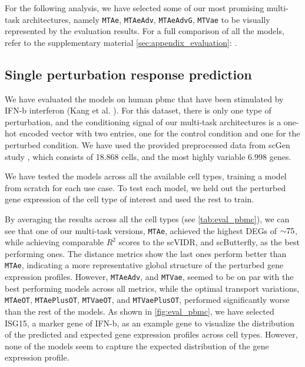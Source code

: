 \documentclass[12pt, a4paper]{article}
\newcommand{\crefwithname}[1]{\cref{#1}: \nameref{#1}}
\begin{document}
For the following analysis, we have selected some of our most promising multi-task architectures, namely \verb|MTAe|, \verb|MTAeAdv|, \verb|MTAeAdvG|, \verb|MTVae| to be visually represented by the evaluation results. For a full comparison of all the models, refer to the supplementary material \crefwithname{sec:appendix_evaluation}. 

\subsection{Single perturbation response prediction}
\label{sec:eval_single_perturbation}

We have evaluated the models on human \gls{pbmc} that have been stimulated by IFN-b interferon (Kang et al. \cite{kanaGenerativeModelingSinglecell2023}). For this dataset, there is only one type of perturbation, and the conditioning signal of our multi-task architectures is a one-hot encoded vector with two entries, one for the control condition and one for the perturbed condition. We have used the provided preprocessed data from scGen study \cite{lotfollahiScGenPredictsSinglecell2019}, which consists of 18.868 cells, and the most highly variable 6.998 genes.

We have tested the models across all the available cell types, training a model from scratch for each use case. To test each model, we held out the perturbed gene expression of the cell type of interest and used the rest to train.

By averaging the results across all the cell types (see \cref{tab:eval_pbmc}), we can see that one of our multi-task versions, \verb|MTAe|, achieved the highest DEGs of $\small{\sim} 75$, while achieving comparable $R^2$ scores to the scVIDR, and scButterfly, as the best performing ones.  The distance metrics show the last ones perform better than \verb|MTAe|, indicating a more representative global structure of the perturbed gene expression profiles. However, \verb|MTAeAdv|, and \verb|MTVae|, seemed to be on par with the best performing models across all metrics, while the optimal transport variations, \verb|MTAeOT|, \verb|MTAePlusOT|, \verb|MTVaeOT|, and \verb|MTVaePlusOT|, performed significantly worse than the rest of the models.
As shown in \cref{fig:eval_pbmc}, we have selected ISG15, a marker gene of IFN-b, as an example gene to visualize the distribution of the predicted and expected gene expression profiles across cell types. However, none of the models seem to capture the expected distribution of the gene expression profile.
\end{document}
